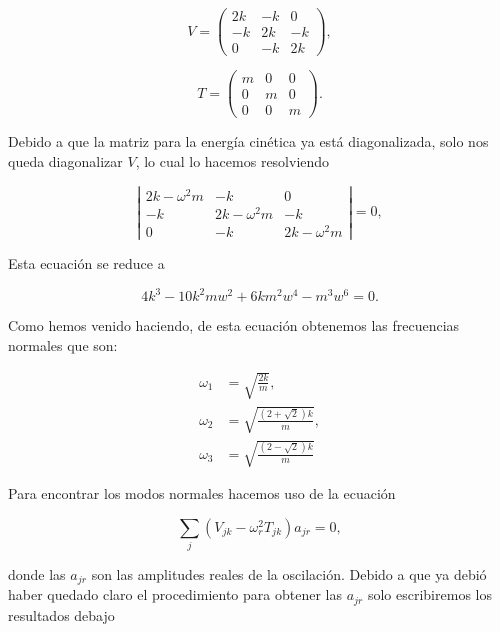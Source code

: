 \documentclass[a4paper,10pt]{article}
\numberwithin{equation}{section}
\begin{document}
\begin{equation}
 V = \begin{pmatrix}
      2k & -k & 0 \\
      -k & 2k & -k \\
      0 & -k & 2k
     \end{pmatrix},
\end{equation}

\begin{equation}
 T = \begin{pmatrix}
      m & 0 & 0 \\
      0 & m & 0 \\
      0 & 0 & m
     \end{pmatrix}.
\end{equation}

Debido a que la matriz para la energía cinética ya está diagonalizada, solo nos queda 
diagonalizar $V$, lo cual lo hacemos resolviendo

\begin{equation}
 \left| \begin{matrix}
	    2k - \omega^2 m & -k & 0 \\
	    -k & 2k - \omega^2 m & -k \\
	    0 & -k & 2k - \omega^2 m
     \end{matrix}\right| = 0,
\end{equation}

Esta ecuación se reduce a 

\begin{equation}
 4 k^{3} - 10 k^{2} m w^{2} + 6 k m^{2} w^{4} - m^{3} w^{6} = 0.
\end{equation}

Como hemos venido haciendo, de esta ecuación obtenemos las frecuencias normales que son:

\begin{align}
 \omega_1 &= \sqrt{\frac{2k}{m}} , \\
 \omega_2 &= \sqrt{\frac{(2+\sqrt{2})k}{m}}, \\
 \omega_3 &= \sqrt{\frac{(2-\sqrt{2})k}{m}}
\end{align}

Para encontrar los modos normales hacemos uso de la ecuación

\begin{equation}
 \sum_j (V_{jk} - \omega^2_r T_{jk})a_{jr} = 0,
\end{equation}

donde las $a_{jr}$ son las amplitudes reales de la oscilación. Debido a que ya debió
haber quedado claro el procedimiento para obtener las $a_{jr}$ solo escribiremos 
los resultados debajo
\end{document}

